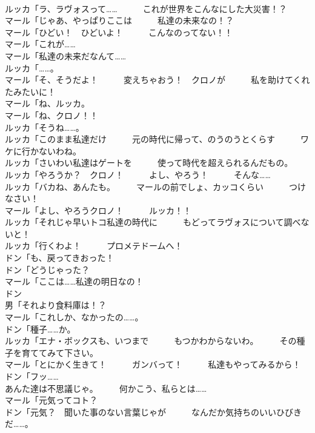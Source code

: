 \documentclass[8pt]{extreport}
\begin{document}
\begin{CJK}{UTF8}{min}
\\	ルッカ「ラ、ラヴォスって……　　　これが世界をこんなにした大災害！？	
\\	マール「じゃあ、やっぱりここは　　　私達の未来なの！？	
\\	マール「ひどい！　ひどいよ！　　　こんなのってない！！	
\\	マール「これが……	
\\	マール「私達の未来だなんて……	
\\	ルッカ「……。	
\\	マール「そ、そうだよ！　　　変えちゃおう！　クロノが　　　私を助けてくれたみたいに！	
\\	マール「ね、ルッカ。	
\\	マール「ね、クロノ！！	
\\	ルッカ「そうね……。	
\\	ルッカ「このまま私達だけ　　　元の時代に帰って、のうのうとくらす　　　ワケに行かないわね。	
\\	ルッカ「さいわい私達はゲートを　　　使って時代を超えられるんだもの。	
\\	ルッカ「やろうか？　クロノ！　　　よし、やろう！　　　そんな……	
\\	ルッカ「バカね、あんたも。　　　マールの前でしょ、カッコくらい　　　つけなさい！	
\\	マール「よし、やろうクロノ！　　　ルッカ！！	
\\	ルッカ「それじゃ早いトコ私達の時代に　　　もどってラヴォスについて調べないと！	
\\	ルッカ「行くわよ！　　　プロメテドームへ！	
\\	ドン「も、戻ってきおった！	
\\	ドン「どうじゃった？	
\\	マール「ここは……私達の明日なの！	
\\	ドン
\\	男「それより食料庫は！？	
\\	マール「これしか、なかったの……。	
\\	ドン「種子……か。	
\\	ルッカ「エナ・ボックスも、いつまで　　　もつかわからないわ。　　　その種子を育ててみて下さい。	
\\	マール「とにかく生きて！　　　ガンバって！　　　私達もやってみるから！	
\\	ドン「フッ……	
\\	あんた達は不思議じゃ。　　　何かこう、私らとは……	
\\	マール「元気ってコト？	
\\	ドン「元気？　聞いた事のない言葉じゃが　　　なんだか気持ちのいいひびきだ……。	

\end{CJK}
\end{document}

